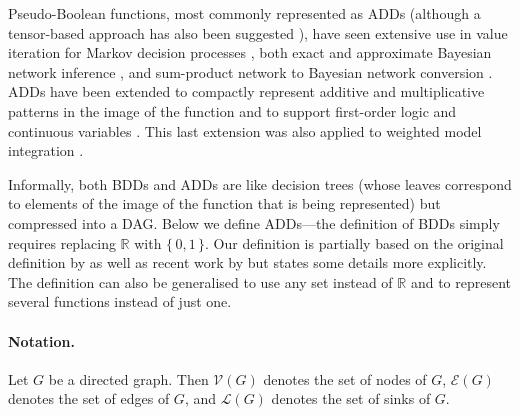 Pseudo-Boolean functions, most commonly represented as ADDs (although a
tensor-based approach has also been suggested
\citep{DBLP:journals/corr/abs-1908-04381,DBLP:conf/cp/DudekPV20}), have seen
extensive use in value iteration for Markov decision processes
\citep{DBLP:conf/uai/HoeySHB99}, both exact and approximate Bayesian network
inference \citep{DBLP:conf/ijcai/ChaviraD07,DBLP:conf/uai/GogateD11}, and
sum-product network to Bayesian network conversion
\citep{DBLP:conf/icml/ZhaoMP15}. ADDs have been extended to compactly represent
additive and multiplicative patterns in the image of the function
\citep{DBLP:conf/ijcai/SannerM05} and to support first-order logic
\citep{DBLP:journals/ai/SannerB09} and continuous variables
\citep{DBLP:conf/uai/SannerDB11}. This last extension was also applied to
weighted model integration
\citep{DBLP:conf/ijcai/BellePB15,DBLP:conf/ijcai/KolbMSBK18}.

Informally, both BDDs and ADDs are like decision trees (whose leaves correspond
to elements of the image of the function that is being represented) but
compressed into a DAG\@. Below we define ADDs---the definition of BDDs simply
requires replacing $\mathbb{R}$ with $\{\, 0, 1 \,\}$. Our definition is
partially based on the original definition by
\citet{DBLP:journals/fmsd/BaharFGHMPS97} as well as recent work by
\citet{DBLP:conf/cp/DudekPV20} but states some details more explicitly. The
definition can also be generalised to use any set instead of $\mathbb{R}$ and to
represent several functions instead of just one.

\paragraph*{Notation.}
Let $G$ be a directed graph. Then $\mathcal{V}(G)$ denotes the set of nodes of
$G$, $\mathcal{E}(G)$ denotes the set of edges of $G$, and $\mathcal{L}(G)$
denotes the set of sinks of $G$.

